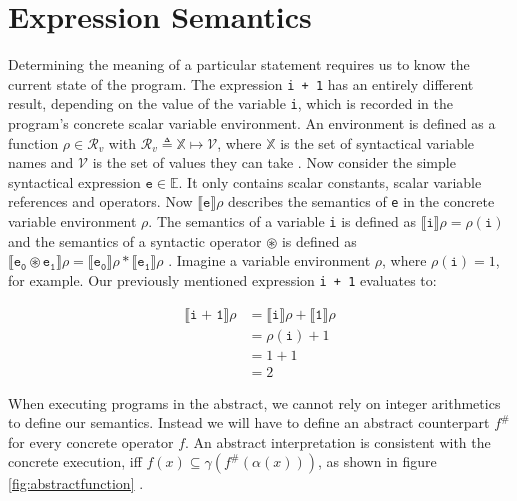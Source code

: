 \section{Expression Semantics}

Determining the meaning of a particular statement requires us to know the current state of the program. The expression \texttt{i + 1} has an entirely different result, depending on the value of the variable \texttt{i}, which is recorded in the program's concrete scalar variable environment. An environment is defined as a function $\rho\in\mathcal{R}_v$ with $\mathcal{R}_v \triangleq \mathbb{X}\mapsto\mathcal{V}$, where $\mathbb{X}$ is the set of syntactical variable names and $\mathcal{V}$ is the set of values they can take \cite{cousot2011}.
Now consider the simple syntactical expression $\mathtt{e}\in\mathbb{E}$. It only contains scalar constants, scalar variable references and operators. Now $\llbracket\mathtt{e}\rrbracket\rho$ describes the semantics of \texttt{e} in the concrete variable environment $\rho$. The semantics of a variable \texttt{i} is defined as $\llbracket\mathtt{i}\rrbracket\rho=\rho(\mathtt{i})$ and the semantics of a syntactic operator $\circledast$ is defined as $\llbracket\mathtt{e_0\circledast e_1}\rrbracket\rho=\llbracket\mathtt{e_0}\rrbracket\rho \ast\llbracket\mathtt{e_1}\rrbracket\rho$ \cite{scott1971}. 
Imagine a variable environment $\rho$, where $\rho(\mathtt{i})=1$, for example. Our previously mentioned expression \texttt{i + 1} evaluates to:

\begin{equation*}
\begin{aligned}
\llbracket\mathtt{i \;\texttt{+}\; 1}\rrbracket\rho &=\llbracket\mathtt{i}\rrbracket\rho +\llbracket\mathtt{1}\rrbracket\rho \\
& = \rho(\mathtt{i}) + 1\\
& = 1+1\\
& = 2
\end{aligned}
\end{equation*}
\vspace{1mm}

\noindent When executing programs in the abstract, we cannot rely on integer arithmetics to define our semantics. Instead we will have to define an abstract counterpart $f^\#$ for every concrete operator $f$. An abstract interpretation is consistent with the concrete execution, iff $f(x)\subseteq\gamma(f^\#(\alpha(x)))$, as shown in figure \ref{fig:abstractfunction} \cite{cousot1977}.

